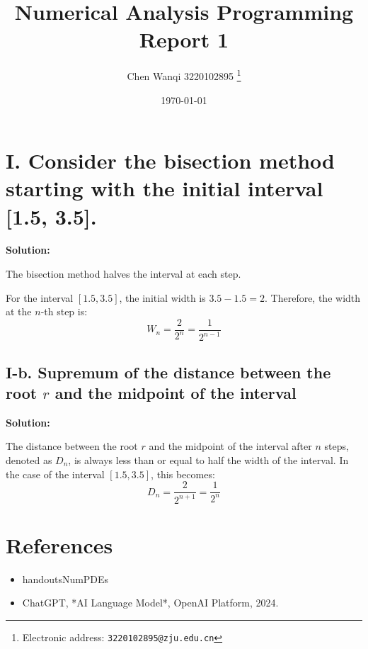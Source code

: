 \documentclass[a4paper]{article}
\begin{document}
\title{Numerical Analysis Programming Report  1}

\author{Chen Wanqi 3220102895
  \thanks{Electronic address: \texttt{3220102895@zju.edu.cn}}}


\date{\today}

\maketitle


\section*{I. Consider the bisection method starting with the initial interval [1.5, 3.5]. }

\textbf{Solution:}

The bisection method halves the interval at each step.

For the interval $[1.5, 3.5]$, the initial width is $3.5 - 1.5 = 2$. Therefore, the width at the $n$-th step is: 
\[
W_n = \frac{2}{2^n} = \frac{1}{2^{n-1}}
\]

\subsection*{I-b. Supremum of the distance between the root $r$ and the midpoint of the interval}

\textbf{Solution:}

The distance between the root $r$ and the midpoint of the interval after $n$ steps, denoted as $D_n$, is always less than or equal to half the width of the interval. In the case of the interval $[1.5, 3.5]$, this becomes:
\[
D_n = \frac{2}{2^{n+1}} = \frac{1}{2^n}
\]

\section*{References}
\begin{itemize}
   \item handoutsNumPDEs
   \item ChatGPT, *AI Language Model*, OpenAI Platform, 2024.
\end{itemize}
\end{document}
